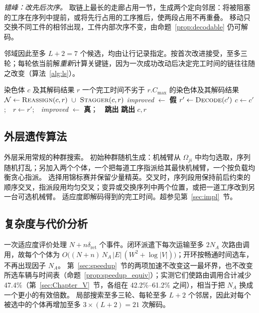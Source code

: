 \documentclass[manuscript,screen,review]{acmart}
\newcommand{\RouteCallCutLo}{42.2\%}     %
\newcommand{\RouteCallCutHi}{61.2\%}     %
\newcommand{\RouteCallCut}{47.4\%}
\begin{document}
\emph{错峰：改先后次序。} 取链上最长的走廊占用一节，生成两个定向邻居：将被阻塞的工序在序列中提前，或将先行占用的工序推后，使两段占用不再重叠。
移动只交换不同工件的相邻出现，工件内部次序不变，由命题~\ref{prop:decodable} 仍可解码。

邻域因此至多 $L+2=7$ 个候选，均由让行记录指定。按首次改进接受，至多三轮；每轮依当前解\emph{重新}计算关键链，因为一次成功改动后决定完工时间的链往往随之改变（算法~\ref{alg:ls}）。

\begin{algorithm}[t]
\caption{\textsc{ContentionGuidedSearch}：按让行记录的局部搜索}
\label{alg:ls}
\small
\begin{algorithmic}[1]
\Require 染色体 $c$ 及其解码结果 $r$
\Ensure 一个完工时间不劣于 $r.C_{\max}$ 的染色体及其解码结果
  \State $\mathcal{N}\gets\textsc{Reassign}(c,r)\ \cup\ \textsc{Stagger}(c,r)$
  \State \textit{improved} $\gets$ \textbf{假}
    \State $r'\gets\textsc{Decode}(c')$
      \State $c\gets c'$;\ \ $r\gets r'$;\ \ \textit{improved} $\gets$
             \textbf{真}；\ \ \textbf{跳出}
    \EndIf
  \EndFor
   \State \textbf{跳出} \EndIf
\EndFor
\State \Return $c,r$
\end{algorithmic}
\end{algorithm}

\subsection{外层遗传算法}

外层采用常规的种群搜索。
初始种群随机生成：机械臂从 $\Omega_{ji}$ 中均匀选取，序列随机打乱；另加入两个个体，一个把每道工序指派给其最快机械臂，一个按负载均衡贪心指派。
选择用锦标赛并保留少量精英。交叉时，序列段用保持前后约束的顺序交叉，指派段用均匀交叉；变异或交换序列中两个位置，或把一道工序改到另一台可选机械臂。
适应度即解码得到的完工时间。超参见第~\ref{sec:impl}~节。

\subsection{复杂度与代价分析}

一次适应度评价处理 $N+n\delta_{\mathrm{ret}}$ 个事件。闭环派遣下每次运输至多 $2N_A$ 次路由调用，故每个个体为
$O\bigl((N+n)\,N_A\,|E|\,(W^{2}+\log|V|)\bigr)$；开环按畅通时间选车，不再出现因子 $N_A$。
第~\ref{sec:speedup}~节的两项加速不改变这一最坏界，也不改变所选车辆与时间表（命题~\ref{prop:speedup_equiv}）；实测它们使路由调用合计减少 \RouteCallCut{}（第~\ref{sec:Chapter_V}~节，各组在 \RouteCallCutLo{}--\RouteCallCutHi{} 之间），相当于把 $N_A$ 换成一个更小的有效倍数。
局部搜索至多三轮、每轮至多 $L+2$ 个邻居，因此对每个被选中的个体再增加至多 $3\times(L+2)=21$ 次解码。
\end{document}
